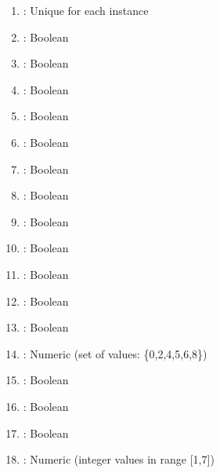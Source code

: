 \documentclass[letterpaper,10pt,english]{jupyterBook}
\begin{document}
\begin{enumerate}
%
\item {} 
\sphinxAtStartPar
{}: Unique for each instance

\item {} 
\sphinxAtStartPar
{}: Boolean

\item {} 
\sphinxAtStartPar
{}: Boolean

\item {} 
\sphinxAtStartPar
{}: Boolean

\item {} 
\sphinxAtStartPar
{}: Boolean

\item {} 
\sphinxAtStartPar
{}: Boolean

\item {} 
\sphinxAtStartPar
{}: Boolean

\item {} 
\sphinxAtStartPar
{}: Boolean

\item {} 
\sphinxAtStartPar
{}: Boolean

\item {} 
\sphinxAtStartPar
{}: Boolean

\item {} 
\sphinxAtStartPar
{}: Boolean

\item {} 
\sphinxAtStartPar
{}: Boolean

\item {} 
\sphinxAtStartPar
{}: Boolean

\item {} 
\sphinxAtStartPar
{}: Numeric (set of values: \{0,2,4,5,6,8\})

\item {} 
\sphinxAtStartPar
{}: Boolean

\item {} 
\sphinxAtStartPar
{}: Boolean

\item {} 
\sphinxAtStartPar
{}: Boolean

\item {} 
\sphinxAtStartPar
{}: Numeric (integer values in range {[}1,7{]})

\end{enumerate}
\end{document}
